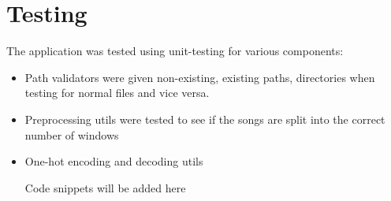 \newpage
\section{Testing}

The application was tested using unit-testing for various components:
\begin{itemize}
	\item Path validators were given non-existing, existing paths, directories when testing for normal files and vice versa.
	\item Preprocessing utils were tested to see if the songs are split into the correct number of windows
	\item One-hot encoding and decoding utils
	
	Code snippets will be added here
\end{itemize}